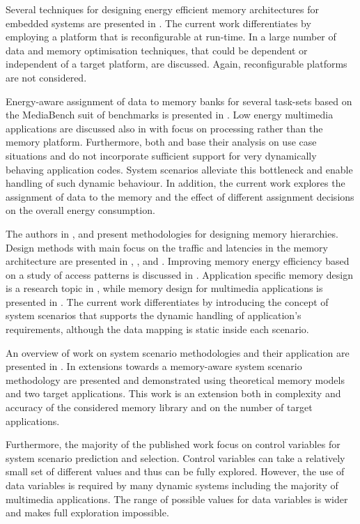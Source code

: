 \documentclass[prodmode,acmtodaes]{acmsmall}
\begin{document}
Several techniques for designing energy efficient memory architectures for embedded systems are presented in \cite{Mac02}. 
The current work differentiates by employing a platform that is reconfigurable at run-time. 
In \cite{Pgk01} a large number of data and memory optimisation techniques, that could be dependent or independent of a target platform, are discussed. 
Again, reconfigurable platforms are not considered.

Energy-aware assignment of data to memory banks for several task-sets based on the MediaBench suit of benchmarks is presented in \cite{Mar03}. 
Low energy multimedia applications are discussed also in \cite{Chu02} with focus on processing rather than the memory platform. 
Furthermore, both \cite{Mar03} and \cite{Chu02} base their analysis on use case situations and do not incorporate sufficient support for very dynamically behaving application codes. 
System scenarios alleviate this bottleneck and enable handling of such dynamic behaviour. 
In addition, the current work explores the assignment of data to the memory and the effect of different assignment decisions on the overall energy consumption.

The authors in \cite{abraham1999automatic}, \cite{jacob1996analytical} and \cite{li1999hardware} present methodologies for designing memory hierarchies.
Design methods with main focus on the traffic and latencies in the memory architecture are presented in \cite{chen1999loop}, \cite{grun2000mist}, \cite{jantsch1994hardware} and \cite{passes1995multi}.
Improving memory energy efficiency based on a study of access patterns is discussed in \cite{kandemir2001improving}.
Application specific memory design is a research topic in \cite{schmit1997synthesis}, while memory design for multimedia applications is presented in \cite{oshima1997high}.
The current work differentiates by introducing the concept of system scenarios that supports the dynamic handling of application's requirements, although the data mapping is static inside each scenario. 

An overview of work on system scenario methodologies and their application are presented in \cite{Gheorghita2007}. 
In \cite{Fil12} extensions towards a memory-aware system scenario methodology are presented and demonstrated using theoretical memory models and two target applications. 
This work is an extension both in complexity and accuracy of the considered memory library and on the number of target applications. 

Furthermore, the majority of the published work focus on control variables for system scenario prediction and selection. 
Control variables can take a relatively small set of different values and thus can be fully explored. However, the use of data variables \cite{Elena2010} is required by many dynamic systems including the majority of multimedia applications. 
The range of possible values for data variables is wider and makes full exploration impossible. 
\end{document}

